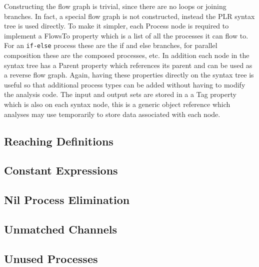   Constructing the flow graph is trivial, since there are no loops or joining
  branches. In fact, a special flow graph is not constructed, instead the PLR
  syntax tree is used directly. To make it simpler, each \textsf{Process} node
  is required to implement a \textsf{FlowsTo} property which is a list of all
  the processes it can flow to. For an \texttt{if-else} process these are the 
  if and else branches, for parallel composition these are the composed 
  processes, etc. In addition each node in the syntax tree has a \textsf{Parent} 
  property which references its parent and can be used as a reverse flow graph.
  Again, having these properties directly on the syntax tree is useful so
  that additional process types can be added without having to modify the
  analysis code. The input and output sets are stored in a a \textsf{Tag} property
  which is also on each syntax node, this is a generic object reference which
  analyses may use temporarily to store data associated with each node.
  

\subsection{Reaching Definitions}\label{reaching_definitions}

\subsection{Constant Expressions}

\subsection{Nil Process Elimination}

\subsection{Unmatched Channels}

\subsection{Unused Processes}


	